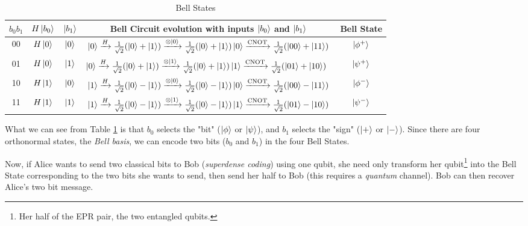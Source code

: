 \documentclass[11pt, oneside]{article}   	%
\begin{document}
\begin{table}[H]
\centering
\begin{tabular}{c | c | c | c | c}
$b_{0} b_{1}$  & $H \ket{b_0}$ & $\ket{b_1}$ & Bell Circuit evolution with inputs $\ket{b_0}$ and $\ket{b_1}$  & Bell State\\
\hline
00  & $H\ket{0}$ & $\ket{0}$ & $\ket{0} \xrightarrow{\scriptsize H}  \frac{1}{\sqrt{2}} (\ket{0} + \ket{1}) 
  \xrightarrow{\otimes \ket{0}}  \frac{1}{\sqrt{2}} (\ket{0} + \ket{1}) \ket{0} \xrightarrow{\scriptsize \text{CNOT}} \frac{1}{\sqrt{2}} (\ket{00} + \ket{11})$ & $\ket{\phi^+}$ \\
01  & $H\ket{0}$ & $\ket{1}$ & $ \ket{0} \xrightarrow{\scriptsize H} \frac{1}{\sqrt{2}} (\ket{0} + \ket{1})  
  \xrightarrow{\scriptsize \otimes \ket{1}} \frac{1}{\sqrt{2}} (\ket{0} + \ket{1})  \ket{1} \xrightarrow{\scriptsize \text{CNOT}}  \frac{1}{\sqrt{2}} (\ket{01} + \ket{10})$\ & $\ket{\psi^+}$ \\
10  & $H\ket{1}$ & $\ket{0}$ & $\ket{1} \xrightarrow{\scriptsize H}  \frac{1}{\sqrt{2}} (\ket{0} - \ket{1})  \xrightarrow{\scriptsize \otimes \ket{0}} \frac{1}{\sqrt{2}} (\ket{0} - \ket{1})  \ket{0} \xrightarrow{\scriptsize \text{CNOT}} \frac{1}{\sqrt{2}}  (\ket{00} - \ket{11})$ & $\ket{\phi^-}$ \\
11    & $H\ket{1}$ & $\ket{1}$ & $\ket{1} \xrightarrow{\scriptsize H}  \frac{1}{\sqrt{2}} (\ket{0} - \ket{1}) 
  \xrightarrow{\scriptsize \otimes  \ket{1}}  \frac{1}{\sqrt{2}} (\ket{0} - \ket{1})  \ket{1} \xrightarrow{\scriptsize \text{CNOT}} \frac{1}{\sqrt{2}}  (\ket{01} - \ket{10})$ & $\ket{\psi^-}$
\end{tabular}
\caption{Bell States}
\label{tab:bell_state}
\end{table}

\bigskip
\noindent
What we can see from Table \ref{tab:bell_state} is that $b_0$ selects the "bit" ($\ket{\phi}$ or $\ket{\psi}$), and $b_1$ selects the "sign" ($\ket{+}$ or $\ket{-}$). Since there
are four orthonormal states, the \emph{Bell basis}, we can encode two bits ($b_0$ and $b_1$) in the four Bell States.  

\bigskip
\noindent
Now,  if Alice wants to send two classical bits to  Bob (\emph{superdense coding}) using one qubit, she need only transform her qubit\footnote{Her half of the EPR pair, the two entangled qubits.} 
into the Bell State corresponding to the two bits she wants to send, then send her half to Bob (this requires a \emph{quantum} channel). Bob can then recover Alice's two bit message.
\end{document}
